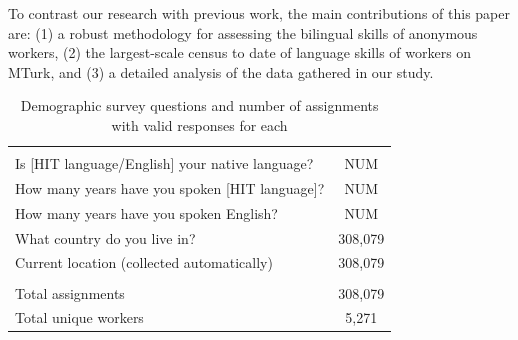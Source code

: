 \documentclass[11pt]{article}
\begin{document}
To contrast our research with previous work, the main contributions of this paper are: (1) a robust methodology for assessing the bilingual  skills of anonymous workers, (2) the largest-scale census to date of language skills of workers on MTurk, and (3) a detailed analysis of the data gathered in our study.



%

\begin{table}[h]
\centering
\begin{tabular}{lc}\hline\hline\\
Is [HIT language/English] your native language? &NUM\\
How many years have you spoken [HIT language]?&NUM\\
How many years have you spoken English?&NUM\\
What country do you live in?&308,079\\
Current location (collected automatically)& 308,079\\
\hline\\
Total assignments& 308,079\\
Total unique workers& 5,271\\
\hline\hline
\end{tabular}
\caption{Demographic survey questions and number of assignments with valid responses for each}
\label{survey-tab}
\end{table}


%
%
\end{document}
